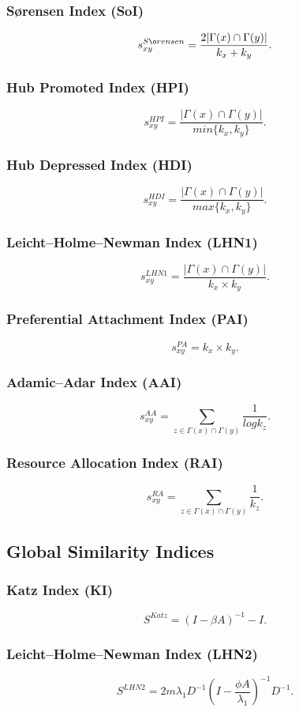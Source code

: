 \documentclass{llncs}
\begin{document}
\subsubsection{S{\o}rensen Index (SoI)}
%
$$s_{xy}^{S{\o}rensen} = \frac{2|\Gamma(x) \cap \Gamma(y)|}{k_x + k_y}.$$
%
\subsubsection{Hub Promoted Index (HPI)}
%
$$s_{xy}^{HPI} = \frac{|\Gamma(x) \cap \Gamma(y)|}{min\{k_x, k_y\}}.$$
%
\subsubsection{Hub Depressed Index (HDI)}
%
$$s_{xy}^{HDI} = \frac{|\Gamma(x) \cap \Gamma(y)|}{max\{k_x, k_y\}}.$$
%
\subsubsection{Leicht–Holme–Newman Index (LHN1)}
%
$$s_{xy}^{LHN1} = \frac{|\Gamma(x) \cap \Gamma(y)|}{k_x \times k_y}.$$
%
\subsubsection{Preferential Attachment Index (PAI)}
%
$$s_{xy}^{PA} = k_x \times k_y.$$
%
\subsubsection{Adamic–Adar Index (AAI)}
%
$$s_{xy}^{AA} = \sum_{z \in \Gamma(x) \cap \Gamma(y)} \frac{1}{log k_z}.$$
%
\subsubsection{Resource Allocation Index (RAI)}
%
$$s_{xy}^{RA} = \sum_{z \in \Gamma(x) \cap \Gamma(y)} \frac{1}{k_z}.$$
%
\subsection{Global Similarity Indices}
%
\subsubsection{Katz Index (KI)}
%
$$S^{Katz} = (I - \beta A)^{-1} - I.$$
%
\subsubsection{Leicht–Holme–Newman Index (LHN2)}
%
$$S^{LHN2} = 2 m \lambda_1 D^{-1} (I - \frac{\phi A}{\lambda_1})^{-1} D^{-1}.$$
%
\end{document}
